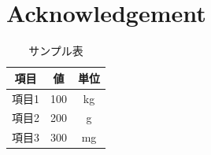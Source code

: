 \documentclass[ams, a4j]{U-AizuGT}
\begin{document}
\section{Acknowledgement}

\begin{thebibliography}{99}
\end{thebibliography}


\begin{table}[ht]
  \centering %
  \caption{サンプル表} %
  \label{tab:sampleTable}
  \begin{tabular}{ccc} %
  \toprule
  項目 & 値 & 単位 \\
  \midrule
  項目1 & 100 & kg \\
  項目2 & 200 & g \\
  項目3 & 300 & mg \\
\bottomrule
\end{tabular}
\end{table}
\end{document}
